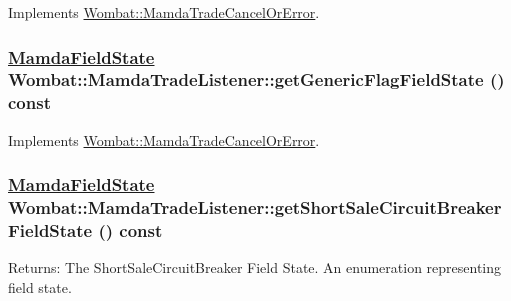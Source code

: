 Implements \hyperlink{classWombat_1_1MamdaTradeCancelOrError_ed7b73cb88b3c9813bbe7a79e1a25c87}{Wombat::Mamda\-Trade\-Cancel\-Or\-Error}.\hypertarget{classWombat_1_1MamdaTradeListener_98bb7d4f99af6f7b565506fb9b79665d}{
\subsubsection[getGenericFlagFieldState]{\setlength{\rightskip}{0pt plus 5cm}\hyperlink{namespaceWombat_93aac974f2ab713554fd12a1fa3b7d2a}{Mamda\-Field\-State} Wombat::Mamda\-Trade\-Listener::get\-Generic\-Flag\-Field\-State () const}}
\label{classWombat_1_1MamdaTradeListener_98bb7d4f99af6f7b565506fb9b79665d}




Implements \hyperlink{classWombat_1_1MamdaTradeCancelOrError_dcb98107626628f22341cccc440b54e0}{Wombat::Mamda\-Trade\-Cancel\-Or\-Error}.\hypertarget{classWombat_1_1MamdaTradeListener_2630b69a9a27a1772e3f4315c254a466}{
\subsubsection[getShortSaleCircuitBreakerFieldState]{\setlength{\rightskip}{0pt plus 5cm}\hyperlink{namespaceWombat_93aac974f2ab713554fd12a1fa3b7d2a}{Mamda\-Field\-State} Wombat::Mamda\-Trade\-Listener::get\-Short\-Sale\-Circuit\-Breaker\-Field\-State () const}}
\label{classWombat_1_1MamdaTradeListener_2630b69a9a27a1772e3f4315c254a466}


\begin{Desc}
\item[Returns:]The Short\-Sale\-Circuit\-Breaker Field State. An enumeration representing field state. \end{Desc}


